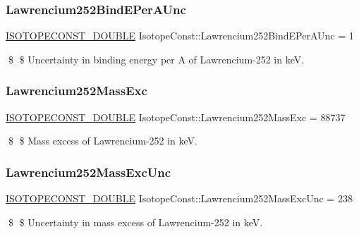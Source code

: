 \subsubsection{\texorpdfstring{Lawrencium252\+Bind\+E\+Per\+A\+Unc}{Lawrencium252BindEPerAUnc}}
{\footnotesize\ttfamily \mbox{\hyperlink{group___isotope_const-_macros_ga8f45a7272ce02c0b4c65c44636ed719a}{I\+S\+O\+T\+O\+P\+E\+C\+O\+N\+S\+T\+\_\+\+D\+O\+U\+B\+LE}} Isotope\+Const\+::\+Lawrencium252\+Bind\+E\+Per\+A\+Unc = 1}

\$ \$ Uncertainty in binding energy per A of Lawrencium-\/252 in keV. \mbox{\label{group___isotope_const-_lawrencium-_lr252_gaa7dc3aeec38e4c3c0b95b8e0478b7de5}} 
\subsubsection{\texorpdfstring{Lawrencium252\+Mass\+Exc}{Lawrencium252MassExc}}
{\footnotesize\ttfamily \mbox{\hyperlink{group___isotope_const-_macros_ga8f45a7272ce02c0b4c65c44636ed719a}{I\+S\+O\+T\+O\+P\+E\+C\+O\+N\+S\+T\+\_\+\+D\+O\+U\+B\+LE}} Isotope\+Const\+::\+Lawrencium252\+Mass\+Exc = 88737}

\$ \$ Mass excess of Lawrencium-\/252 in keV. \mbox{\label{group___isotope_const-_lawrencium-_lr252_ga79790563f2abf4294dd40cac55b5c927}} 
\subsubsection{\texorpdfstring{Lawrencium252\+Mass\+Exc\+Unc}{Lawrencium252MassExcUnc}}
{\footnotesize\ttfamily \mbox{\hyperlink{group___isotope_const-_macros_ga8f45a7272ce02c0b4c65c44636ed719a}{I\+S\+O\+T\+O\+P\+E\+C\+O\+N\+S\+T\+\_\+\+D\+O\+U\+B\+LE}} Isotope\+Const\+::\+Lawrencium252\+Mass\+Exc\+Unc = 238}

\$ \$ Uncertainty in mass excess of Lawrencium-\/252 in keV. \mbox{\label{group___isotope_const-_lawrencium-_lr252_ga00fb18278990d7d63a6bd1caab1bacca}} 
